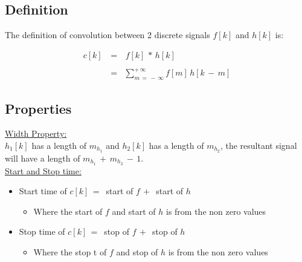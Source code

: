 \documentclass[12pt,a4paper]{book}
\begin{document}
\subsection{Definition}

The definition of convolution between 2 discrete signals $f[k]$ and $h[k]$ is:

\begin{equation}
\begin{array}{rcl}
c[k] \, &=& \, f[k] \, * \, h[k] \\ \\
 &=& \displaystyle\sum_{m \, = \, - \, \infty}^{+ \, \infty} f[m] \, h[k \, - \, m] 		
\end{array}
\label{Eq:TimeDomainDiscrete:Definition_Discrete_Convolution}
\end{equation}

\subsection{Properties}

\underline{Width Property:}\\

$h_1[k]$ has a length of $m_{h_1}$ and $h_2[k]$ has a length of $m_{h_2}$, the resultant signal will have a length of $m_{h_1}  \, + \,m_{h_2} \, - \, 1 $.\\


\underline{Start and Stop time:}\\

\begin{itemize}

\item Start time of $c[k] \, = \, $ start of $f \, + \,$ start of $h$

	\begin{itemize}
	\item Where the start of $f$ and start of $h$ is from the non zero values
	\end{itemize}

\item Stop time of  $c[k] \, = \, $ stop of $f \, + \,$ stop  of $h$

	\begin{itemize}
	\item Where the stop t of $f$ and stop  of $h$ is from the non zero  values
	\end{itemize}

\end{itemize}
\end{document}
